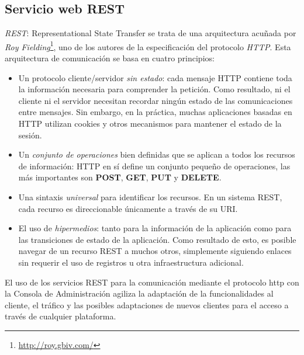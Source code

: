 

\subsection{Servicio web REST}
\label{sub:rest-ws}

\par \emph{REST}: Representational State Transfer se trata de una arquitectura acuñada por \emph{Roy Fielding}\footnote{\url{http://roy.gbiv.com/}}, uno de los autores de la especificación del protocolo \emph{HTTP}. Esta arquitectura de comunicación se basa en cuatro principios:

\begin{itemize}
	\item Un protocolo cliente/servidor \emph{sin estado}: cada mensaje HTTP contiene toda la información necesaria para comprender la petición. Como resultado, ni el cliente ni el servidor necesitan recordar ningún estado de las comunicaciones entre mensajes. Sin embargo, en la práctica, muchas aplicaciones basadas en HTTP utilizan cookies y otros mecanismos para mantener el estado de la sesión.

	\item Un \emph{conjunto de operaciones} bien definidas que se aplican a todos los recursos de información: HTTP en sí define un conjunto pequeño de operaciones, las más importantes son \textbf{POST}, \textbf{GET}, \textbf{PUT} y \textbf{DELETE}.

	\item Una sintaxis \emph{universal} para identificar los recursos. En un sistema REST, cada recurso es direccionable únicamente a través de su URI.

	\item El uso de \emph{hipermedios}: tanto para la información de la aplicación como para las transiciones de estado de la aplicación. Como resultado de esto, es posible navegar de un recurso REST a muchos otros, simplemente siguiendo enlaces sin requerir el uso de registros u otra infraestructura adicional.
\end{itemize}

\par El uso de los servicios REST para la comunicación mediante el protocolo http con la Consola de Administración agiliza la adaptación de la funcionalidades al cliente, el tráfico y las posibles adaptaciones de nuevos clientes para el acceso a través de cualquier plataforma.

